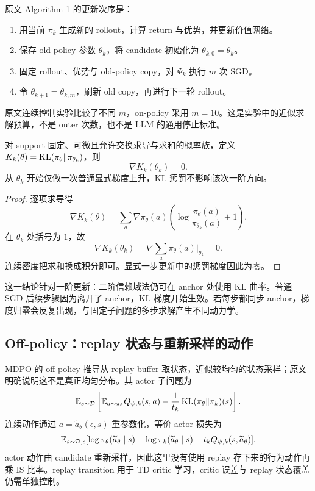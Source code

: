 原文 Algorithm 1 的更新次序是：
\begin{enumerate}
 \item 用当前 $\pi_k$ 生成新的 rollout，计算 return 与优势，并更新价值网络。
 \item 保存 old-policy 参数 $\theta_k$，将 candidate 初始化为 $\theta_{k,0}=\theta_k$。
 \item 固定 rollout、优势与 old-policy copy，对 $\Psi_k$ 执行 $m$ 次 SGD。
 \item 令 $\theta_{k+1}=\theta_{k,m}$，刷新 old copy，再进行下一轮 rollout。
\end{enumerate}
原文连续控制实验比较了不同 $m$，on-policy 采用 $m=10$。这是实验中的近似求解预算，不是 outer 次数，也不是 LLM 的通用停止标准。

\begin{proposition}
\label{prop:foundation-kl-zero}
对 support 固定、可微且允许交换求导与求和的概率族，定义 $K_k(\theta)=\operatorname{KL}(\pi_\theta\Vert\pi_{\theta_k})$，则
\[
 \nabla K_k(\theta_k)=0.
\]
从 $\theta_k$ 开始仅做一次普通显式梯度上升，KL 惩罚不影响该次一阶方向。
\end{proposition}
\begin{proof}
逐项求导得
\[
 \nabla K_k(\theta)=\sum_a\nabla\pi_\theta(a)
 \left(\log\frac{\pi_\theta(a)}{\pi_{\theta_k}(a)}+1\right).
\]
在 $\theta_k$ 处括号为 $1$，故
\[
 \nabla K_k(\theta_k)=\nabla\sum_a\pi_\theta(a)\big|_{\theta_k}=0.
\]
连续密度把求和换成积分即可。显式一步更新中的惩罚梯度因此为零。
\end{proof}

这一结论针对一阶更新：二阶信赖域法仍可在 anchor 处使用 KL 曲率。普通 SGD 后续步骤因为离开了 anchor，KL 梯度开始生效。若每步都同步 anchor，梯度归零会反复出现，与固定子问题的多步求解产生不同动力学。

\subsection{Off-policy：replay 状态与重新采样的动作}

MDPO 的 off-policy 推导从 replay buffer 取状态，近似较均匀的状态采样；原文明确说明这不是真正均匀分布。其 actor 子问题为
\[
 \mathbb{E}_{s\sim\mathcal D}
 \left[\mathbb{E}_{a\sim\pi_\theta}Q_{\psi,k}(s,a)
       -\frac1{t_k}\operatorname{KL}(\pi_\theta\Vert\pi_k)(s)\right].
\]
连续动作通过 $a=\widetilde a_\theta(\epsilon,s)$ 重参数化，等价 actor 损失为
\[
 \mathbb{E}_{s\sim\mathcal D,\epsilon}
 [\log\pi_\theta(\widetilde a_\theta\mid s)
 -\log\pi_k(\widetilde a_\theta\mid s)-t_kQ_{\psi,k}(s,\widetilde a_\theta)].
\]
actor 动作由 candidate 重新采样，因此这里没有使用 replay 存下来的行为动作再乘 IS 比率。replay transition 用于 TD critic 学习，critic 误差与 replay 状态覆盖仍需单独控制。

